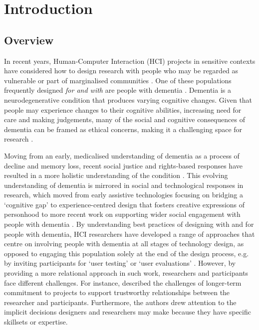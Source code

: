 \chapter{Introduction}

\section{Overview}
\label{Intro: Overiew}
In recent years, Human-Computer Interaction (HCI) projects in sensitive contexts have considered how to design research with people who may be regarded as vulnerable or part of marginalised communities \citep{waycott_challenge_2015}. One of these populations frequently designed \textit{for and with} are people with dementia \citep{suijkerbuijk_active_2019}. Dementia is a neurodegenerative condition that produces varying cognitive changes. Given that people may experience changes to their cognitive abilities, increasing need for care and making judgements, many of the social and cognitive consequences of dementia can be framed as ethical concerns, making it a challenging space for research \citep{herrmann_systematic_2018}.

Moving from an early, medicalised understanding of dementia as a process of decline and memory loss, recent social justice and rights-based responses have resulted in a more holistic understanding of the condition \citep{shakespeare_rights_2019}. This evolving understanding of dementia is mirrored in social and technological responses in research, which moved from early assistive technologies focusing on bridging a ‘cognitive gap’ \citep{mulvenna_supporting_2010} to experience-centred design that fosters creative expressions of personhood \citep{morrissey_value_2017} to more recent work on supporting wider social engagement with people with dementia \citep{foley_care_2019, lazar_safe_2019, welsh_ticket_2018}. By understanding best practices of designing with and for people with dementia, HCI researchers have developed a range of approaches that centre on involving people with dementia at all stages of technology design, as opposed to engaging this population solely at the end of the design process, e.g. by inviting participants for ‘user testing’ or ‘user evaluations’ \citep{brankaert_intersections_2019,schorch_designing_2016, vines_designing_2013}. However, by providing a more relational approach in such work, researchers and participants face different challenges. For instance, \cite{hendriks_challenges_2014} described the challenges of longer-term commitment to projects to support trustworthy relationships between the researcher and participants. Furthermore, the authors drew attention to the implicit decisions designers and researchers may make because they have specific skillsets or expertise.

